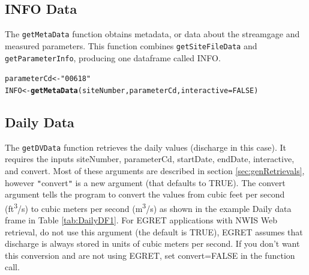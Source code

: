 \documentclass[a4paper,11pt]{article}\usepackage[]{graphicx}\usepackage[]{color}
\makeatletter
\newcommand{\hlnum}[1]{\textcolor[rgb]{0.686,0.059,0.569}{#1}}%
\newcommand{\hlstr}[1]{\textcolor[rgb]{0.192,0.494,0.8}{#1}}%
\newcommand{\hlstd}[1]{\textcolor[rgb]{0.345,0.345,0.345}{#1}}%
\newcommand{\hlkwb}[1]{\textcolor[rgb]{0.69,0.353,0.396}{#1}}%
\newcommand{\hlkwc}[1]{\textcolor[rgb]{0.333,0.667,0.333}{#1}}%
\newcommand{\hlkwd}[1]{\textcolor[rgb]{0.737,0.353,0.396}{\textbf{#1}}}%
\newenvironment{kframe}{%
 \def\at@end@of@kframe{}%
 \ifinner\ifhmode%
  \def\at@end@of@kframe{\end{minipage}}%
  \begin{minipage}{\columnwidth}%
 \fi\fi%
 \def\FrameCommand##1{\hskip\@totalleftmargin \hskip-\fboxsep
 \colorbox{shadecolor}{##1}\hskip-\fboxsep
     \hskip-\linewidth \hskip-\@totalleftmargin \hskip\columnwidth}%
 \MakeFramed {\advance\hsize-\width
   \@totalleftmargin\z@ \linewidth\hsize
   \@setminipage}}%
 {\par\unskip\endMakeFramed%
 \at@end@of@kframe}
\newenvironment{knitrout}{}{} %
\makeatother
\begin{document}
\subsection{INFO Data}
\label{INFOsubsection}
The \texttt{getMetaData} function obtains metadata, or data about the streamgage and measured parameters. This function combines \texttt{getSiteFileData} and \texttt{getParameterInfo}, producing one dataframe called INFO.

\begin{knitrout}
\color{fgcolor}\begin{kframe}
\begin{alltt}
\hlstd{parameterCd} \hlkwb{<-} \hlstr{"00618"}
\hlstd{INFO} \hlkwb{<-}\hlkwd{getMetaData}\hlstd{(siteNumber,parameterCd,} \hlkwc{interactive}\hlstd{=}\hlnum{FALSE}\hlstd{)}
\end{alltt}
\end{kframe}
\end{knitrout}


\FloatBarrier

\subsection{Daily Data}
\label{Dailysubsection}
The \texttt{getDVData} function retrieves the daily values (discharge in this case).  It requires the inputs siteNumber, parameterCd, startDate, endDate, interactive, and convert. Most of these arguments are described in section \ref{sec:genRetrievals}, however \texttt{"}convert\texttt{"} is a new argument (that defaults to TRUE). The convert argument tells the program to convert the values from cubic feet per second (ft\textsuperscript{3}/s) to cubic meters per second (m\textsuperscript{3}/s) as shown in the example Daily data frame in Table \ref{tab:DailyDF1}. For EGRET applications with NWIS Web retrieval, do not use this argument (the default is TRUE), EGRET assumes that discharge is always stored in units of cubic meters per second. If you don't want this conversion and are not using EGRET, set convert=FALSE in the function call. 
\end{document}

